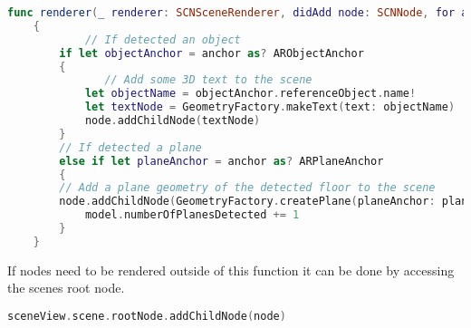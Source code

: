 \begin{appendices}
\begin{lstlisting}[language=swift]
func renderer(_ renderer: SCNSceneRenderer, didAdd node: SCNNode, for anchor: ARAnchor)
    {
    	    // If detected an object
        if let objectAnchor = anchor as? ARObjectAnchor
        {
        	   // Add some 3D text to the scene
            let objectName = objectAnchor.referenceObject.name!
            let textNode = GeometryFactory.makeText(text: objectName)
            node.addChildNode(textNode)
        }
        // If detected a plane
        else if let planeAnchor = anchor as? ARPlaneAnchor
        {
        // Add a plane geometry of the detected floor to the scene
        node.addChildNode(GeometryFactory.createPlane(planeAnchor: planeAnchor, metalDevice: metalDevice!))
            model.numberOfPlanesDetected += 1
        }
    }
\end{lstlisting}

If nodes need to be rendered outside of this function it can be done by accessing the
scenes root node.

\begin{lstlisting}[language=swift]
sceneView.scene.rootNode.addChildNode(node)
\end{lstlisting}


\end{appendices}
